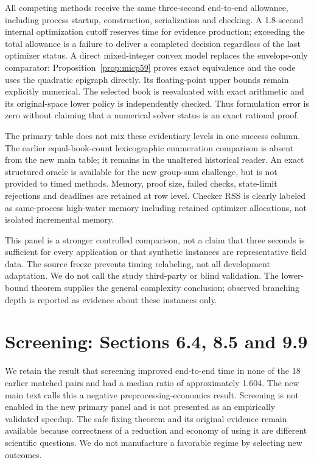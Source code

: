 All competing methods receive the same three-second end-to-end allowance, including process startup, construction, serialization and checking. A 1.8-second internal optimization cutoff reserves time for evidence production; exceeding the total allowance is a failure to deliver a completed decision regardless of the last optimizer status. A direct mixed-integer convex model replaces the envelope-only comparator: Proposition~\ref{prop:micp59} proves exact equivalence and the code uses the quadratic epigraph directly. Its floating-point upper bounds remain explicitly numerical. The selected book is reevaluated with exact arithmetic and its original-space lower policy is independently checked. Thus formulation error is zero without claiming that a numerical solver status is an exact rational proof.

The primary table does not mix these evidentiary levels in one success column. The earlier equal-book-count lexicographic enumeration comparison is absent from the new main table; it remains in the unaltered historical reader. An exact structured oracle is available for the new group-sum challenge, but is not provided to timed methods. Memory, proof size, failed checks, state-limit rejections and deadlines are retained at row level. Checker RSS is clearly labeled as same-process high-water memory including retained optimizer allocations, not isolated incremental memory.



This panel is a stronger controlled comparison, not a claim that three seconds is sufficient for every application or that synthetic instances are representative field data. The source freeze prevents timing relabeling, not all development adaptation. We do not call the study third-party or blind validation. The lower-bound theorem supplies the general complexity conclusion; observed branching depth is reported as evidence about these instances only.

\section{Screening: Sections 6.4, 8.5 and 9.9}
We retain the result that screening improved end-to-end time in none of the 18 earlier matched pairs and had a median ratio of approximately 1.604. The new main text calls this a negative preprocessing-economics result. Screening is not enabled in the new primary panel and is not presented as an empirically validated speedup. The safe fixing theorem and its original evidence remain available because correctness of a reduction and economy of using it are different scientific questions. We do not manufacture a favorable regime by selecting new outcomes.

